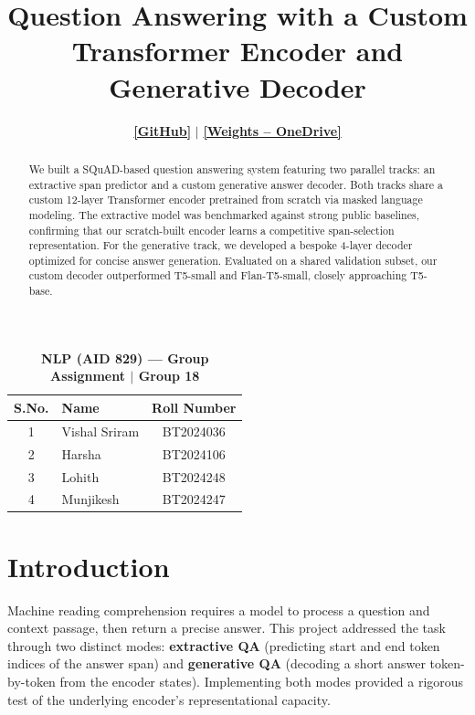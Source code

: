 \documentclass[10pt,twocolumn]{article}
\title{\vspace{-1.5em}\textbf{Question Answering with a Custom Transformer Encoder and Generative Decoder}\vspace{-0.5em}}
\author{\href{https://github.com/Harsha081459/-Question-Answering-System-with-a-Custom-Transformer-Encoder-and-Generative-Decoder}{\textbf{[GitHub]}} \quad $\mid$ \quad \href{https://iiitbac-my.sharepoint.com/:f:/g/personal/vishal_sriram_iiitb_ac_in/IgBJMBmHEodfQba6fYpup9aiAdhsUH577v5oWa_W0i20VqM?e=j7DCc6}{\textbf{[Weights -- OneDrive]}}}
\date{}
\begin{document}
\maketitle
\vspace{-2.5em}

\begin{table}[H]
\centering
\small
\caption*{\textbf{NLP (AID 829) --- Group Assignment $\mid$ Group 18}}
\vspace{-0.5em}
\begin{tabular}{@{}clc@{}}
\toprule
\textbf{S.No.} & \textbf{Name} & \textbf{Roll Number} \\
\midrule
1 & Vishal Sriram & BT2024036 \\
2 & Harsha & BT2024106 \\
3 & Lohith & BT2024248 \\
4 & Munjikesh & BT2024247 \\
\bottomrule
\end{tabular}
\end{table}
\vspace{-0.5em}

\begin{abstract}
We built a SQuAD-based question answering system featuring two parallel tracks: an extractive span predictor and a custom generative answer decoder. Both tracks share a custom 12-layer Transformer encoder pretrained from scratch via masked language modeling. The extractive model was benchmarked against strong public baselines, confirming that our scratch-built encoder learns a competitive span-selection representation. For the generative track, we developed a bespoke 4-layer decoder optimized for concise answer generation. Evaluated on a shared validation subset, our custom decoder outperformed T5-small and Flan-T5-small, closely approaching T5-base.
\end{abstract}

\section{Introduction}
Machine reading comprehension requires a model to process a question and context passage, then return a precise answer. This project addressed the task through two distinct modes: \textbf{extractive QA} (predicting start and end token indices of the answer span) and \textbf{generative QA} (decoding a short answer token-by-token from the encoder states). Implementing both modes provided a rigorous test of the underlying encoder's representational capacity.
\end{document}
